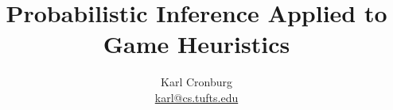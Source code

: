 \documentclass[color = usenames]{beamer}
\title{Probabilistic Inference Applied to Game Heuristics}
\author{
  \texorpdfstring{
    Karl Cronburg \\
    \href{mailto:karl@cs.tufts.edu}{karl@cs.tufts.edu}
  }
  {Karl Cronburg}
}
\institute{Tufts University}
\date{}
\begin{document}
\frame{\titlepage}


\end{document}
